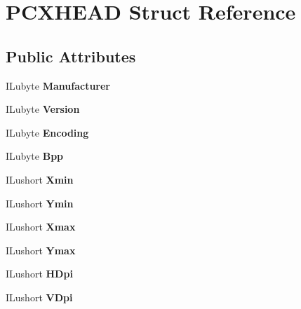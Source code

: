 \hypertarget{structPCXHEAD}{}\section{P\+C\+X\+H\+E\+AD Struct Reference}
\label{structPCXHEAD}
\subsection*{Public Attributes}
\begin{DoxyCompactItemize}
\item 
\mbox{\label{structPCXHEAD_a9b534cd918f4377169482edbfd846707}} 
I\+Lubyte {\bfseries Manufacturer}
\item 
\mbox{\label{structPCXHEAD_a9a8c70e2974914cc21021c2ba5ef2760}} 
I\+Lubyte {\bfseries Version}
\item 
\mbox{\label{structPCXHEAD_a9683686ab9b863e0643356fb6ad7613b}} 
I\+Lubyte {\bfseries Encoding}
\item 
\mbox{\label{structPCXHEAD_af010d2cb3f91e5c63ee725ac338cc9e4}} 
I\+Lubyte {\bfseries Bpp}
\item 
\mbox{\label{structPCXHEAD_a005597a657a1a1f8d0655104bf5e4934}} 
I\+Lushort {\bfseries Xmin}
\item 
\mbox{\label{structPCXHEAD_a5a34faa1624922ed3811f5e4424e3961}} 
I\+Lushort {\bfseries Ymin}
\item 
\mbox{\label{structPCXHEAD_a2c77ccf0d6c09f571d63e9161af27e21}} 
I\+Lushort {\bfseries Xmax}
\item 
\mbox{\label{structPCXHEAD_a9a8574681fe6b34c01ca7f3693a66172}} 
I\+Lushort {\bfseries Ymax}
\item 
\mbox{\label{structPCXHEAD_a3cceca89edbf843437ce7d3bf262f920}} 
I\+Lushort {\bfseries H\+Dpi}
\item 
\mbox{\label{structPCXHEAD_a4dcd9d16431446a3da83565ed5b5f54d}} 
I\+Lushort {\bfseries V\+Dpi}
\item 

\end{DoxyCompactItemize}
